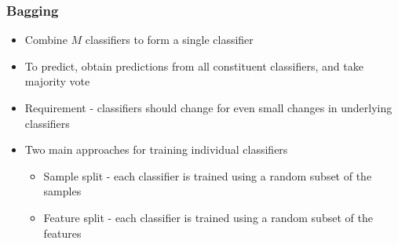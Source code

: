 \documentclass{beamer}
\begin{document}
    \begin{frame}
        \frametitle{Bagging}
        \begin{itemize}
            \item{Combine $M$ classifiers to form a single classifier}
            \item{To predict, obtain predictions from all constituent classifiers, and take majority vote}
            \item{Requirement - classifiers should change for even small changes in underlying classifiers}
            \item{
            Two main approaches for training individual classifiers
            \begin{itemize}
                \item{Sample split - each classifier is trained using a random subset of the samples}
                \item{Feature split - each classifier is trained using a random subset of the features}
            \end{itemize}
            }
        \end{itemize}
    \end{frame}
\end{document}
